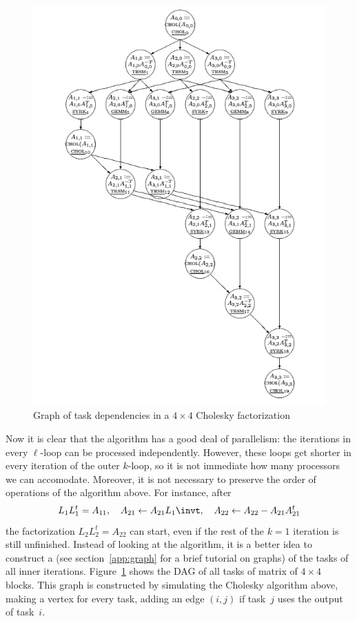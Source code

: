 \begin{figure}[ht]
\includegraphics[scale=.7]{graphics-public/chol4dag}
  \caption{Graph of task dependencies in a $4\times4$ Cholesky
    factorization}
  \label{fig:chol4dag}
\end{figure}

Now it is clear that the algorithm has a good deal of parallelism: the
iterations in every $\ell$-loop can be processed independently.
However, these loops get shorter in every iteration of the outer
$k$-loop, so it is not immediate how many processors we can
accomodate. Moreover, it is not necessary to preserve the order of
operations of the algorithm above. For instance, after
\[
  L_1L_1^t=A_{11},\quad A_{21}\leftarrow A_{21}L_1\invt,\quad
  A_{22}\leftarrow A_{22}-A_{21}A_{21}^t
\]
the factorization $L_2L_2^t=A_{22}$ can start, even if the rest of the
$k=1$ iteration is still unfinished. Instead of looking at the
algorithm, it is a better idea to construct a  (see
section~\ref{app:graph} for a brief tutorial on graphs) of the tasks
of all inner iterations. Figure~\ref{fig:chol4dag} shows the \ac{DAG}
of all tasks of matrix of $4\times4$ blocks. This graph is constructed
by simulating the Cholesky algorithm above, making a vertex for every
task, adding an edge $(i,j)$ if task~$j$ uses the output of task~$i$.

